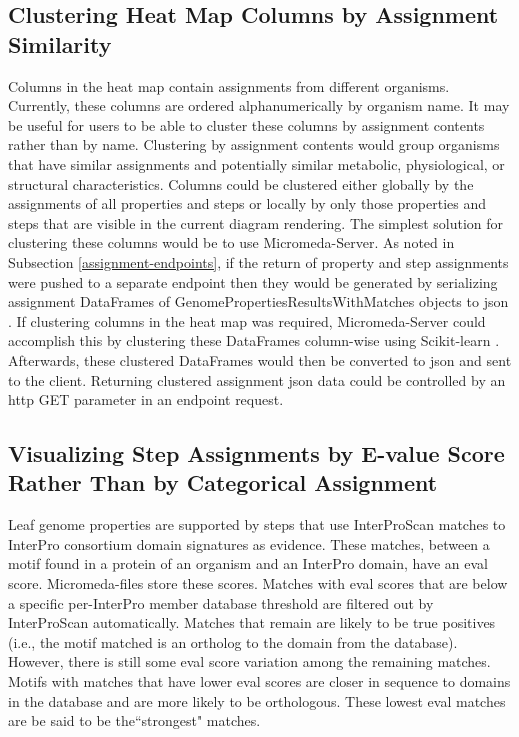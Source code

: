 \subsection{Clustering Heat Map Columns by Assignment Similarity}

Columns in the heat map contain assignments from different organisms. Currently, these columns are ordered alphanumerically by organism name. It may be useful for users to be able to cluster these columns by assignment contents rather than by name. Clustering by assignment contents would group organisms that have similar assignments and potentially similar metabolic, physiological, or structural characteristics. Columns could be clustered either globally by the assignments of all properties and steps or locally by only those properties and steps that are visible in the current diagram rendering. The simplest solution for clustering these columns would be to use Micromeda-Server. As noted in Subsection \ref{assignment-endpoints}, if the return of property and step assignments were pushed to a separate endpoint then they would be generated by serializing assignment DataFrames of GenomePropertiesResultsWithMatches objects to \gls{json} \cite{bray2014rfc}. If clustering columns in the heat map was required, Micromeda-Server could accomplish this by clustering these DataFrames column-wise using Scikit-learn \cite{pedregosa2011scikit}. Afterwards, these clustered DataFrames would then be converted to \gls{json} and sent to the client. Returning clustered assignment \gls{json} data could be controlled by an \gls{http} GET parameter in an endpoint request.

\subsection{Visualizing Step Assignments by E-value Score Rather Than by Categorical Assignment} \label{interface-e-value}

Leaf genome properties are supported by steps that use InterProScan matches to InterPro consortium domain signatures as evidence. These matches, between a motif found in a protein of an organism and an InterPro domain, have an \gls{eval} score. Micromeda-files store these scores. Matches with \gls{eval} scores that are below a specific per-InterPro member database threshold are filtered out by InterProScan automatically. Matches that remain are likely to be true positives (i.e., the motif matched is an ortholog to the domain from the database). However, there is still some \gls{eval} score variation among the remaining matches. Motifs with matches that have lower \gls{eval} scores are closer in sequence to domains in the database and are more likely to be orthologous. These lowest \gls{eval} matches are be said to be the``strongest" matches.

